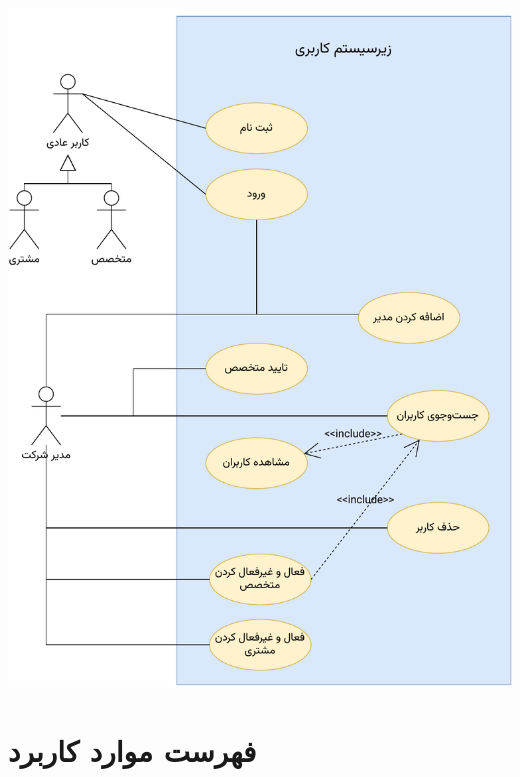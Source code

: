 \begin{center}
	\includegraphics[scale=0.9, page=4]{figs/usecase.pdf}
\end{center}

\newpage

\newpage
\section{فهرست موارد کاربرد}


